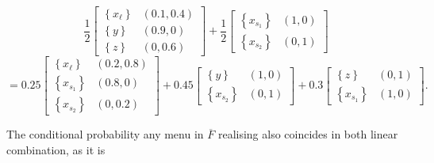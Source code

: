 \[
	\frac{1}{2}
	\begin{bmatrix}
		\left\{ x_{\ell} \right\} & \left( 0.1, 0.4 \right) \\
		\left\{ y \right\}        & \left( 0.9, 0 \right)   \\
		\left\{ z \right\}        & \left( 0, 0.6 \right)
	\end{bmatrix}
	+ \frac{1}{2}
	\begin{bmatrix}
		\left\{ x_{s_1} \right\} & \left( 1, 0 \right) \\
		\left\{ x_{s_2} \right\} & \left( 0, 1 \right)
	\end{bmatrix}
\]
\[
	= 0.25 \begin{bmatrix}
		\left\{ x_{\ell} \right\} & \left( 0.2, 0.8 \right) \\
		\left\{ x_{s_1} \right\}  & \left( 0.8, 0 \right)   \\
		\left\{ x_{s_2} \right\}  & \left( 0, 0.2 \right)
	\end{bmatrix}
	+ 0.45
	\begin{bmatrix}
		\left\{ y \right\}       & \left( 1, 0 \right) \\
		\left\{ x_{s_2} \right\} & \left( 0, 1 \right)
	\end{bmatrix}
	+ 0.3
	\begin{bmatrix}
		\left\{ z \right\}       & \left( 0, 1 \right) \\
		\left\{ x_{s_1} \right\} & \left( 1, 0 \right)
	\end{bmatrix} .
\]

The conditional probability any menu in \( \overline{F} \) realising also coincides in both linear combination, as it is

